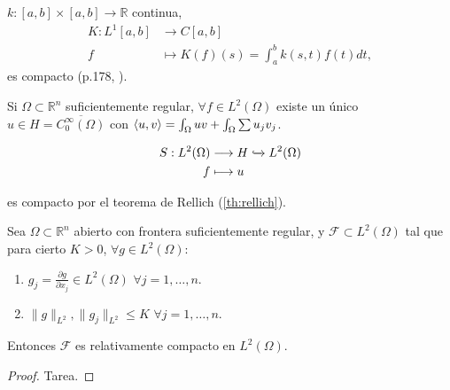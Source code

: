 \begin{example}
  $k:[a,b]\times[a,b]\to \mathbb{R}$ continua,
  \begin{align*}
    K: L^1[a,b] &\longrightarrow C[a,b] \\
    f &\longmapsto K(f)(s) = \int_{a}^{b} k(s,t)f(t)dt 
  ,\end{align*}
  es compacto (p.178, \cite{cascales2012}).
\end{example}

\begin{example}
  Si $\Omega\subset \mathbb{R}^n$ suficientemente regular, $\forall f\in
  L^2(\Omega)$ existe un único $u\in H=\overline{C_0^\infty(\Omega)}$ con
  $\left\langle u,v\right\rangle=\int_\Omega uv + \int_\Omega \sum u_jv_j$.

  \begin{align*}
    S: L^2(\Omega) &\longrightarrow H \xhookrightarrow{} L^2(\Omega) \\
     f&\longmapsto u 
  \end{align*}

  es compacto por el teorema de Rellich (\ref{th:rellich}).
\end{example}

\begin{theorem}[Rellich]
  \label{th:rellich}
  Sea $\Omega\subset \mathbb{R}^n$ abierto con frontera suficientemente regular,
  y $\mathcal{F}\subset L^2(\Omega)$ tal que para cierto $K>0$, $\forall g\in
  L^2(\Omega)$:
  \begin{enumerate}
    \item $g_j=\frac{\partial g}{\partial x_j} \in L^2(\Omega)$ $\forall
      j=1,\ldots,n$.
    \item $\|g\|_{L^2},\|g_j\|_{L^2}\le K$ $\forall j=1,\ldots,n$.
  \end{enumerate}

  Entonces $\mathcal{F}$ es relativamente compacto en $L^2(\Omega)$.
\end{theorem}
\begin{proof}
  Tarea.
\end{proof}


